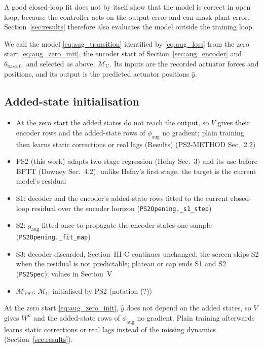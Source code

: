 A good closed-loop fit does not by itself show that the model is correct in
open loop, because the controller acts on the output error and can mask plant
error.
Section~\ref{sec:results} therefore also evaluates the model outside the
training loop.

We call the model \eqref{eq:aug_transition} identified by \eqref{eq:aug_loss}
from the zero start \eqref{eq:aug_zero_init}, the encoder start of
Section~\ref{sec:aug_encoder} and $\theta_{\mathrm{base},0}$, and selected as
above, $\mathcal M_{\mathrm U}$.
Its inputs are the recorded actuator forces and positions, and its output is
the predicted actuator positions $\hat y$.

\subsection{Added-state initialisation}\label{sec:aug_ps2}
\ifdraft
\begin{itemize}
\item At the zero start the added states do not reach the output, so $V$ gives their encoder rows and the added-state rows of $\phi_{\mathrm{aug}}$ no gradient; plain training then learns static corrections or real lags (Results) (PS2-METHOD Sec.~2.2)
\item PS2 (this work) adapts two-stage regression (Hefny Sec.~3) and its use before BPTT (Downey Sec.~4.2); unlike Hefny's first stage, the target is the current model's residual
\item S1: decoder and the encoder's added-state rows fitted to the current closed-loop residual over the encoder horizon (\texttt{PS2Opening.\_s1\_step})
\item S2: $g_{\mathrm{aug}}$ fitted once to propagate the encoder states one sample (\texttt{PS2Opening.\_fit\_map})
\item S3: decoder discarded, Section~III-C continues unchanged; the screen skips S2 when the residual is not predictable; plateau or cap ends S1 and S2 (\texttt{PS2Spec}); values in Section~V
\item $\mathcal M_{\mathrm{PS2}}$: $\mathcal M_{\mathrm U}$ initialised by PS2 (notation (?))
\end{itemize}
\fi

At the zero start \eqref{eq:aug_zero_init}, $\hat y$ does not depend on the
added states, so $V$ gives $W^a$ and the added-state rows of
$\phi_{\mathrm{aug}}$ no gradient.
Plain training afterwards learns static corrections or real lags instead of the
missing dynamics (Section~\ref{sec:results}).

